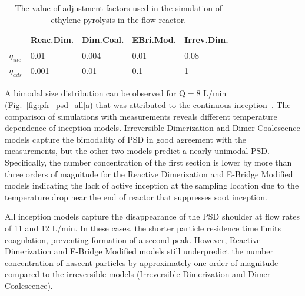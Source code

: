 \begin{table}[!t]
	\caption{The value of adjustment factors used in the simulation of ethylene pyrolysis in the flow reactor.}
	\label{tab:adjustfactor_pfr}
	\centering
	\begin{tabular}{lllll}
		\hline
		& Reac.Dim. & Dim.Coal. & EBri.Mod. & Irrev.Dim. \\
		\hline
		$\eta_{inc}$ & 0.01      & 0.004      & 0.01       & 0.08        \\
		$\eta_{ads}$ & 0.001      & 0.01      & 0.1       & 1 \\
		\hline       
	\end{tabular}
\end{table}

A bimodal size distribution can be observed for $\mathrm{Q}=8$ L/min (Fig.~\ref{fig:pfr_psd_all}a) that was attributed to the continuous inception~\citep{zhao2003measurement}. The comparison of simulations with measurements reveals different temperature dependence of inception models. Irreversible Dimerization and Dimer Coalescence models capture the bimodality of PSD in good agreement with the measurements, but the other two models predict a nearly unimodal PSD. Specifically, the number concentration of the first section is lower by more than three orders of magnitude for the Reactive Dimerization and E-Bridge Modified models indicating the lack of active inception at the sampling location due to the temperature drop near the end of reactor that suppresses soot inception.

All inception models capture the disappearance of the PSD shoulder at flow rates of 11 and 12 L/min. In these cases, the shorter particle residence time limits coagulation, preventing formation of a second peak. However, Reactive Dimerization and E-Bridge Modified models still underpredict the number concentration of nascent particles by approximately one order of magnitude compared to the irreversible models (Irreversible Dimerization and Dimer Coalescence).



